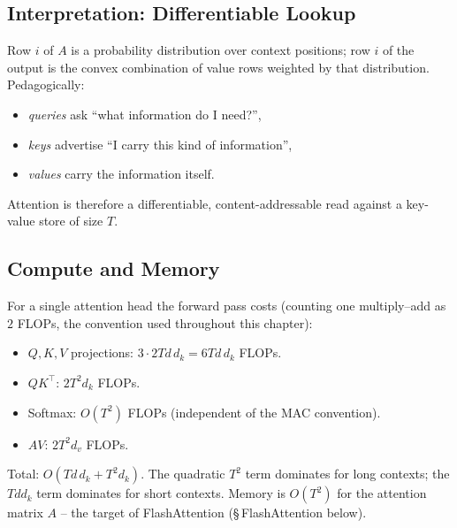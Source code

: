 \subsection{Interpretation: Differentiable Lookup}

Row $i$ of $A$ is a probability distribution over context positions;
row $i$ of the output is the convex combination of value rows weighted
by that distribution. Pedagogically:
\begin{itemize}
  \item \emph{queries} ask ``what information do I need?'',
  \item \emph{keys} advertise ``I carry this kind of information'',
  \item \emph{values} carry the information itself.
\end{itemize}
Attention is therefore a differentiable, content-addressable read
against a key-value store of size $T$.

\subsection{Compute and Memory}

For a single attention head the forward pass costs (counting one
multiply--add as $2$ FLOPs, the convention used throughout this
chapter):
\begin{itemize}
  \item $Q, K, V$ projections: $3 \cdot 2 T d\, d_k = 6 T d\, d_k$ FLOPs.
  \item $Q K^{\top}$: $2 T^2 d_k$ FLOPs.
  \item Softmax: $O(T^2)$ FLOPs (independent of the MAC convention).
  \item $A V$: $2 T^2 d_v$ FLOPs.
\end{itemize}
Total: $O(T d\, d_k + T^2 d_k)$. The quadratic $T^2$ term dominates
for long contexts; the $T d d_k$ term dominates for short contexts.
Memory is $O(T^2)$ for the attention matrix $A$ -- the target of
FlashAttention (\S\,FlashAttention below).

